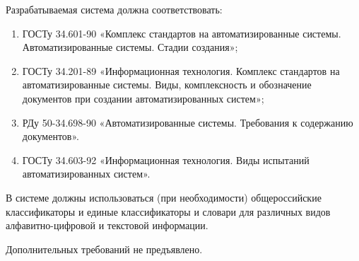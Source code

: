\documentclass[russian, utf8, 12pt,pointsubsection,floatsubsection]{eskdtext}
\begin{document}
Разрабатываемая система должна соответствовать:
\begin{enumerate}
    \item ГОСТу 34.601-90 «Комплекс стандартов на автоматизированные системы. Автоматизированные системы. Стадии создания»;
    \item ГОСТу 34.201-89 «Информационная технология. Комплекс стандартов на автоматизированные системы. Виды, комплексность и обозначение документов при создании автоматизированных систем»;
    \item РДу 50-34.698-90 «Автоматизированные системы. Требования к содержанию документов».
    \item ГОСТу 34.603-92 «Информационная технология. Виды испытаний автоматизированных систем».
\end{enumerate}

В    системе     должны     использоваться    (при    необходимости)
общероссийские классификаторы и единые классификаторы и словари для различных видов алфавитно-цифровой и текстовой информации.



Дополнительных требований не предъявлено.
\end{document}

